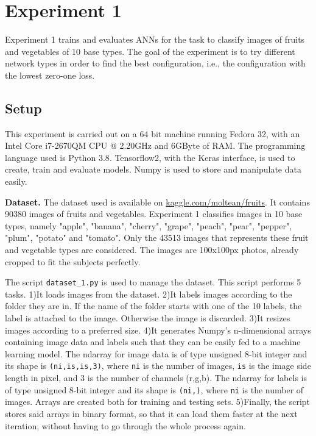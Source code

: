 \section{Experiment 1}
\label{sec:exp1}
Experiment 1 trains and evaluates ANNs for the task to classify images of fruits and vegetables of 10 base types. The goal of the experiment is to try different network types in order to find the best configuration, i.e., the configuration with the lowest zero-one loss.

\subsection{Setup}
This experiment is carried out on a 64 bit machine running Fedora 32, with an Intel\textsuperscript{\textregistered} Core\texttrademark{} i7-2670QM CPU @ 2.20GHz and 6GByte of RAM. The programming language used is Python 3.8\cite{python3}. Tensorflow2\cite{tensorflow2015-whitepaper}, with the Keras\cite{chollet2015keras} interface, is used to create, train and evaluate models. Numpy\cite{harris2020array} is used to store and manipulate data easily.

\textbf{Dataset.}
The dataset used is available on \href{https://www.kaggle.com/moltean/fruits}{kaggle.com/moltean/fruits}. It contains 90380 images of fruits and vegetables. Experiment 1 classifies images in 10 base types, namely "apple", "banana", "cherry", "grape", "peach", "pear", "pepper", "plum", "potato" and "tomato". Only the 43513 images that represents these fruit and vegetable types are considered. The images are 100x100px photos, already cropped to fit the subjects perfectly.

The script \texttt{dataset\_1.py} is used to manage the dataset. This script performs 5 tasks. 1)It loads images from the dataset. 2)It labels images according to the folder they are in. If the name of the folder starts with one of the 10 labels, the label is attached to the image. Otherwise the image is discarded. 3)It resizes images according to a preferred size. 4)It generates Numpy's n-dimensional arrays containing image data and labels such that they can be easily fed to a machine learning model. The ndarray for image data is of type unsigned 8-bit integer and its shape is \texttt{(ni,is,is,3)}, where \texttt{ni} is the number of images, \texttt{is} is the image side length in pixel, and 3 is the number of channels (r,g,b). The ndarray for labels is of type unsigned 8-bit integer and its shape is \texttt{(ni,)}, where \texttt{ni} is the number of images. Arrays are created both for training and testing sets. 5)Finally, the script stores said arrays in binary format, so that it can load them faster at the next iteration, without having to go through the whole process again.

